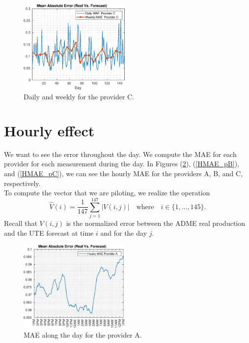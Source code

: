 \documentclass[aoas,preprint]{imsart}
\begin{document}
\begin{figure}[H]
\centering
\includegraphics[width=0.485\textwidth]{plots/mean_errors/prov_C/MAE.eps}
\caption{Daily and weekly for the provider C.}
\label{MAE_pC}
\end{figure}

\section{Hourly effect}

We want to see the error throughout the day. We compute the MAE for each provider for each measurement during the day. In Figures (\ref{HMAE_pA}), (\ref{HMAE_pB}), and (\ref{HMAE_pC}), we can see the hourly MAE for the providers A, B, and C, respectively.\\

To compute the vector that we are piloting, we realize the operation
\begin{equation*}
\hat{V}(i) =\frac{1}{147} \sum_{j=1}^{147}|V(i,j)|\quad\text{where}\quad i\in\{1,\dots,145\}.
\end{equation*}
Recall that $V(i,j)$ is the normalized error between the ADME real production and the UTE forecast at time $i$ and for the day $j$.\\

\begin{figure}[H]
\centering
\includegraphics[width=0.485\textwidth]{plots/mean_errors/prov_A/H_MAE.eps}
\caption{MAE along the day for the provider A.}
\label{HMAE_pA}
\end{figure}
\end{document}

